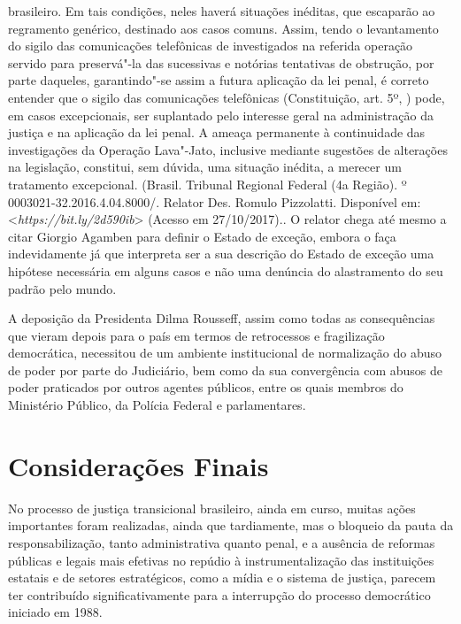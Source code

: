 {{  brasileiro. Em tais condições, neles haverá situações inéditas, que
  escaparão ao regramento genérico, destinado aos casos comuns. Assim,
  tendo o levantamento do sigilo das comunicações telefônicas de
  investigados na referida operação servido para preservá"-la das
  sucessivas e notórias tentativas de obstrução, por parte daqueles,
  garantindo"-se assim a futura aplicação da lei penal, é correto
  entender que o sigilo das comunicações telefônicas (Constituição, art.
  5º, ) pode, em casos excepcionais, ser suplantado pelo interesse
  geral na administração da justiça e na aplicação da lei penal. A
  ameaça permanente à continuidade das investigações da Operação
  Lava"-Jato, inclusive mediante sugestões de alterações na legislação,
  constitui, sem dúvida, uma situação inédita, a merecer um tratamento
  excepcional.} (Brasil. Tribunal Regional Federal (4a Região). 
    º 0003021-32.2016.4.04.8000/. Relator Des. Romulo
  Pizzolatti. Disponível em: \textless{}\emph{https://bit.ly/2d590ib}\textgreater{}
  (Acesso em 27/10/2017).}. O relator chega até mesmo a citar Giorgio
Agamben para definir o Estado de exceção, embora o faça indevidamente já
que interpreta ser a sua descrição do Estado de exceção uma hipótese
necessária em alguns casos e não uma denúncia do alastramento do seu
padrão pelo mundo.

A deposição da Presidenta Dilma Rousseff, assim como todas as
consequências que vieram depois para o país em termos de retrocessos e
fragilização democrática, necessitou de um ambiente institucional de
normalização do abuso de poder por parte do Judiciário, bem como da sua
convergência com abusos de poder praticados por outros agentes públicos,
entre os quais membros do Ministério Público, da Polícia Federal e
parlamentares.

\section{Considerações Finais}

No processo de justiça transicional brasileiro, ainda em curso, muitas
ações importantes foram realizadas, ainda que tardiamente, mas o
bloqueio da pauta da responsabilização, tanto administrativa quanto
penal, e a ausência de reformas públicas e legais mais efetivas no
repúdio à instrumentalização das instituições estatais e de setores
estratégicos, como a mídia e o sistema de justiça, parecem ter
contribuído significativamente para a interrupção do processo
democrático iniciado em 1988.

